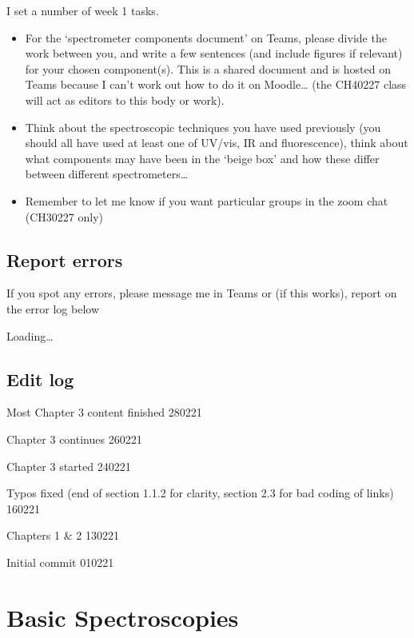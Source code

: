 \documentclass[
]{book}
\begin{document}
I set a number of week 1 tasks.

\begin{itemize}
\item
  For the `spectrometer components document' on Teams, please divide the work between you, and write a few sentences (and include figures if relevant) for your chosen component(s). This is a shared document and is hosted on Teams because I can't work out how to do it on Moodle\ldots{} (the CH40227 class will act as editors to this body or work).
\item
  Think about the spectroscopic techniques you have used previously (you should all have used at least one of UV/vis, IR and fluorescence), think about what components may have been in the `beige box' and how these differ between different spectrometers\ldots{}
\item
  Remember to let me know if you want particular groups in the zoom chat (CH30227 only)
\end{itemize}

\hypertarget{report-errors}{%
\section*{Report errors}\label{report-errors}}

If you spot any errors, please message me in Teams or (if this works), report on the error log below

Loading\ldots{}

\hypertarget{edit-log}{%
\section*{Edit log}\label{edit-log}}

Most Chapter 3 content finished 280221

Chapter 3 continues 260221

Chapter 3 started 240221

Typos fixed (end of section 1.1.2 for clarity, section 2.3 for bad coding of links) 160221

Chapters 1 \& 2 130221

Initial commit 010221

\hypertarget{ch:UVvisfluorIR}{%
\chapter{Basic Spectroscopies}\label{ch:UVvisfluorIR}}
\end{document}
